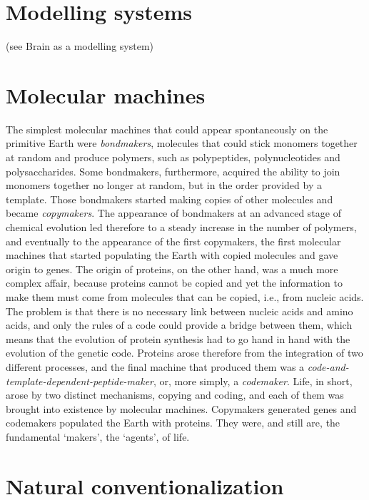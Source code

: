 \documentclass[12pt]{article}
\begin{document}
\section{Modelling systems} (see Brain as a modelling system)
 

\section{Molecular machines}
The simplest molecular machines that could appear spontaneously on the primitive Earth were \textit{bondmakers}, molecules that could stick monomers together at random and produce polymers, such as polypeptides, polynucleotides and polysaccharides. Some bondmakers, furthermore, acquired the ability to join monomers together no longer at random, but in the order provided by a template. Those bondmakers started making copies of other molecules and became \textit{copymakers}. The appearance of bondmakers at an advanced stage of chemical evolution led therefore to a steady increase in the number of polymers, and eventually to the appearance of the first copymakers, the first molecular machines that started populating the Earth with copied molecules and gave origin to genes. The origin of proteins, on the other hand, was a much more complex affair, because proteins cannot be copied and yet the information to make them must come from molecules that can be copied, i.e., from nucleic acids. The problem is that there is no necessary link between nucleic acids and amino acids, and only the rules of a code could provide a bridge between them, which means that the evolution of protein synthesis had to go hand in hand with the evolution of the genetic code. Proteins arose therefore from the integration of two different processes, and the final machine that produced them was a \textit{code-and-template-dependent-peptide-maker}, or, more simply, a \textit{codemaker}. Life, in short, arose by two distinct mechanisms, copying and coding, and each of them was brought into existence by molecular machines. Copymakers generated genes and codemakers populated the Earth with proteins. They were, and still are, the fundamental `makers', the `agents', of life.


\hypertarget{natural_conventionalization}{}
\section{Natural conventionalization}
\end{document}
